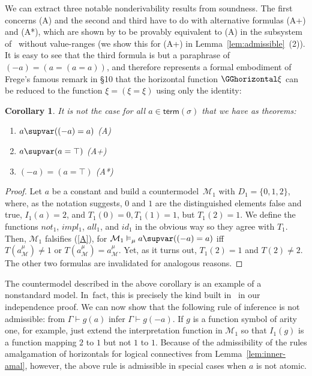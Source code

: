 \documentclass{preprint}
\newtheorem{corollary}[theorem]{Corollary}
\newcommand{\M}{\mathcal{M}}
\newcommand{\term}{\mathsf{term}}
\renewcommand{\to}{\supvar}
\begin{document}
We can extract three notable nonderivability results from soundness. The first concerns (A) and the second and third have to do with alternative formulas (A+) and (A*), which are shown by \citet[\S4]{landini2022stipulations} to be provably equivalent to (A) in the subsystem of \gga~without value-ranges (we show this for (A+) in Lemma~\ref{lem:admissible}~(2)). 
It is easy to see that the third formula is but a paraphrase of $(-a) = (a = (a = a))$, and therefore represents a formal embodiment of Frege's famous remark in \S10 that the horizontal function $\GGhorizontal \xi$ can be reduced to the function $\xi = (\xi = \xi)$ using only the identity: 

\begin{corollary}\label{cor:nonthm}
	It is not the case for all $a \in \term(\sigma)$ that we have as theorems: 
	\begin{enumerate}
		\item $a \to ((-a) = a) $ (A) 
		\item $a \to (a = \top) $ (A+)
		\item $(-a) = (a = \top)$ (A*) 
	\end{enumerate}
\end{corollary}
\begin{proof}
	Let $a$ be a constant and build a countermodel~$\M_1$ with $D_1=\{0,1,2\}$, where, as the notation suggests, $0$ and $1$ are the distinguished elements false and true, $I_1(a)=2$, and $T_1(0)=0, T_1(1)=1$, but $T_1(2)=1$. We define the functions $not_1$, $impl_1$, $all_1$, and $id_1$ in the obvious way so they agree with $T_1$.
	Then, $\M_1$ falsifies (\ref{A}), for $\M_1 \vDash_{\mu} a \to ((-a)=a)$ iff $T(a^{\mu}_{\M}) \neq 1 \text{ or } T(a^{\mu}_{\M}) = a^{\mu}_{\M}$. Yet, as it turns out, $T_1(2)=1$ and $T(2) \neq 2$. 
	The other two formulas are invalidated for analogous reasons. 
\end{proof}

The countermodel described in the above corollary is an example of a nonstandard model. In~fact, this is precisely the kind built in~ in our independence proof.  We can now show that the following rule of inference is not admissible: from $\Gamma \vdash g(a)$ infer $\Gamma \vdash g(-a)$. If $g$ is a function symbol of arity one, for example, just extend the interpretation function in $\M_1$ so that $I_1(g)$ is a function mapping $2$ to $1$ but not $1$ to $1$. Because of the admissibility of the rules amalgamation of horizontals for logical connectives from Lemma~\ref{lem:inner-amal}, however, the above rule is admissible in special cases when $a$ is not atomic. 
\end{document}
